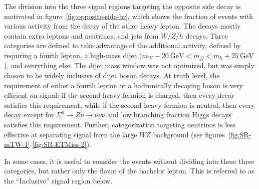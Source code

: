  The division into the three signal regions targeting the opposite side decay is motivated in figure~\ref{fig:opposite-side-br}, which shows the fraction of events with various activity from the decay of the other heavy lepton. The decays mostly contain extra leptons and neutrinos, and jets from $W/Z/h$ decays. Three categories are defined to take advantage of the additional activity, defined by requiring a fourth lepton, a high-mass dijet ($m_{W}-20~\mbox{GeV}<m_{jj}<m_{h}+25~\mbox{GeV}$), and everything else. The dijet mass window was not optimized, but was simply chosen to be widely inclusive of dijet boson decays. At truth level, the requirement of either a fourth lepton or a hadronically decaying boson is very efficient on signal: if the second heavy fermion is charged, then every decay satisfies this requirement, while if the second heavy fermion is neutral, then every decay except for $\Sigma^0\rightarrow Z\nu\rightarrow \nu\nu\nu$ and low branching fraction Higgs decays satisfies this requirement. Further, categorization targeting neutrinos is less effective at separating signal from the large $WZ$ background (see figures~\ref{fig:SR-mTW-1}-\ref{fig:SR-ETMiss-2}). 

In some cases, it is useful to consider the events without dividing into these three categories, but rather only the flavor of the bachelor lepton. This is referred to as the ``Inclusive'' signal region below.

